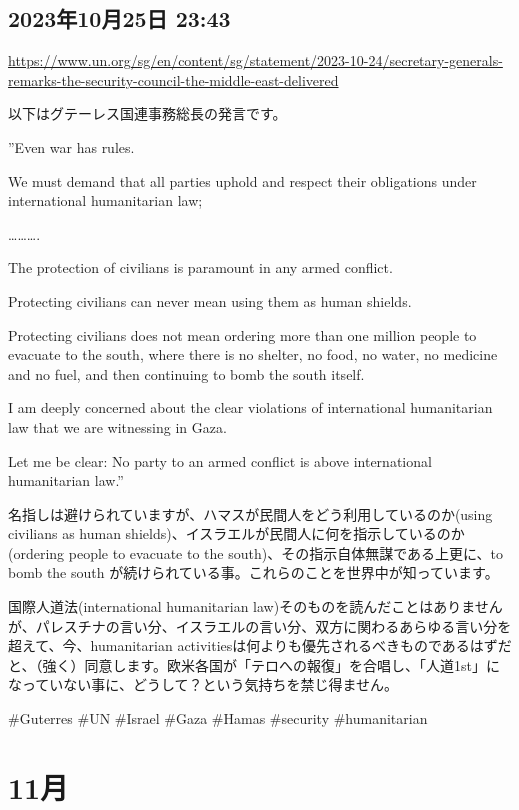 \documentclass[facebook_diary.tex]{subfiles}
\begin{document}
\subsection*{2023年10月25日 23:43}

\url{https://www.un.org/sg/en/content/sg/statement/2023-10-24/secretary-generals-remarks-the-security-council-the-middle-east-delivered}




以下はグテーレス国連事務総長の発言です。


”Even war has rules.


We must demand that all parties uphold and respect their obligations under international humanitarian law;

……….


The protection of civilians is paramount in any armed conflict.


Protecting civilians can never mean using them as human shields.


Protecting civilians does not mean ordering more than one million people to evacuate to the south, where there is no shelter, no food, no water, no medicine and no fuel, and then continuing to bomb the south itself.


I am deeply concerned about the clear violations of international humanitarian law that we are witnessing in Gaza.


Let me be clear:  No party to an armed conflict is above international humanitarian law.”


名指しは避けられていますが、ハマスが民間人をどう利用しているのか(using civilians as human shields)、イスラエルが民間人に何を指示しているのか(ordering people to evacuate to the south)、その指示自体無謀である上更に、to bomb the south が続けられている事。これらのことを世界中が知っています。

国際人道法(international humanitarian law)そのものを読んだことはありませんが、パレスチナの言い分、イスラエルの言い分、双方に関わるあらゆる言い分を超えて、今、humanitarian activitiesは何よりも優先されるべきものであるはずだと、（強く）同意します。欧米各国が「テロへの報復」を合唱し、「人道1st」になっていない事に、どうして？という気持ちを禁じ得ません。


\#Guterres \#UN \#Israel \#Gaza \#Hamas \#security \#humanitarian

\section{11月}
\end{document}
